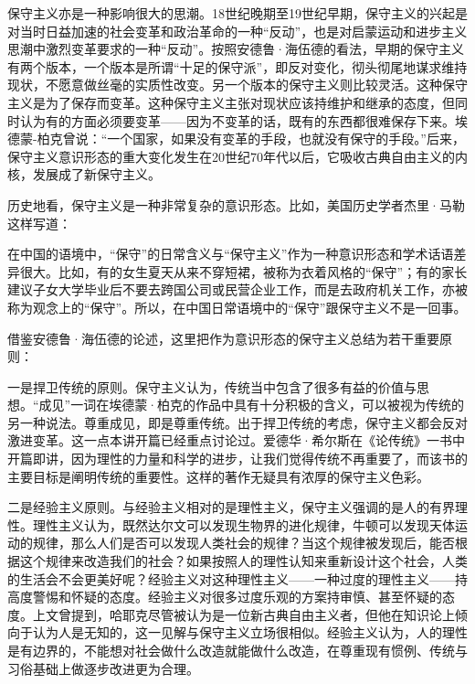 
保守主义亦是一种影响很大的思潮。18世纪晚期至19世纪早期，保守主义的兴起是对当时日益加速的社会变革和政治革命的一种“反动”，也是对启蒙运动和进步主义思潮中激烈变革要求的一种“反动”。按照安德鲁·海伍德的看法，早期的保守主义有两个版本，一个版本是所谓“十足的保守派”，即反对变化，彻头彻尾地谋求维持现状，不愿意做丝毫的实质性改变。另一个版本的保守主义则比较灵活。这种保守主义是为了保存而变革。这种保守主义主张对现状应该持维护和继承的态度，但同时认为有的方面必须要变革——因为不变革的话，既有的东西都很难保存下来。埃德蒙-柏克曾说：“一个国家，如果没有变革的手段，也就没有保守的手段。”后来，保守主义意识形态的重大变化发生在20世纪70年代以后，它吸收古典自由主义的内核，发展成了新保守主义。

历史地看，保守主义是一种非常复杂的意识形态。比如，美国历史学者杰里·马勒这样写道：


在中国的语境中，“保守”的日常含义与“保守主义”作为一种意识形态和学术话语差异很大。比如，有的女生夏天从来不穿短裙，被称为衣着风格的“保守”；有的家长建议子女大学毕业后不要去跨国公司或民营企业工作，而是去政府机关工作，亦被称为观念上的“保守”。所以，在中国日常语境中的“保守”跟保守主义不是一回事。

借鉴安德鲁·海伍德的论述，这里把作为意识形态的保守主义总结为若干重要原则：

一是捍卫传统的原则。保守主义认为，传统当中包含了很多有益的价值与思想。“成见”一词在埃德蒙·柏克的作品中具有十分积极的含义，可以被视为传统的另一种说法。尊重成见，即是尊重传统。出于捍卫传统的考虑，保守主义都会反对激进变革。这一点本讲开篇已经重点讨论过。爱德华·希尔斯在《论传统》一书中开篇即讲，因为理性的力量和科学的进步，让我们觉得传统不再重要了，而该书的主要目标是阐明传统的重要性。这样的著作无疑具有浓厚的保守主义色彩。

二是经验主义原则。与经验主义相对的是理性主义，保守主义强调的是人的有界理性。理性主义认为，既然达尔文可以发现生物界的进化规律，牛顿可以发现天体运动的规律，那么人们是否可以发现人类社会的规律？当这个规律被发现后，能否根据这个规律来改造我们的社会？如果按照人的理性认知来重新设计这个社会，人类的生活会不会更美好呢？经验主义对这种理性主义——一种过度的理性主义——持高度警惕和怀疑的态度。经验主义对很多过度乐观的方案持审慎、甚至怀疑的态度。上文曾提到，哈耶克尽管被认为是一位新古典自由主义者，但他在知识论上倾向于认为人是无知的，这一见解与保守主义立场很相似。经验主义认为，人的理性是有边界的，不能想对社会做什么改造就能做什么改造，在尊重现有惯例、传统与习俗基础上做逐步改进更为合理。

